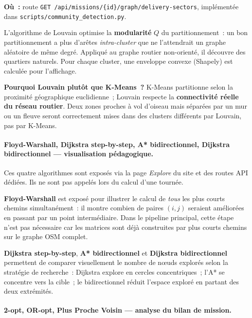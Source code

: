 \documentclass[a4paper, 12pt, twoside]{article}
\begin{document}
\textbf{O\`{u}~:} route \texttt{GET /api/missions/\{id\}/graph/delivery-sectors},
impl\'{e}ment\'{e}e dans \texttt{scripts/community\_detection.py}.

L'algorithme de Louvain optimise la \textbf{modularit\'{e}} $Q$ du partitionnement~:
un bon partitionnement a plus d'ar\^{e}tes \textit{intra-cluster} que ne l'attendrait
un graphe al\'{e}atoire de m\^{e}me degr\'{e}. Appliqu\'{e} au graphe routier non-orient\'{e},
il d\'{e}couvre des quartiers naturels. Pour chaque cluster, une enveloppe convexe
(Shapely) est calcul\'{e}e pour l'affichage.

\textbf{Pourquoi Louvain plut\^{o}t que K-Means~?}
K-Means partitionne selon la proximit\'{e} g\'{e}ographique euclidienne~; Louvain respecte
la \textbf{connectivit\'{e} r\'{e}elle du r\'{e}seau routier}. Deux zones proches \`{a} vol
d'oiseau mais s\'{e}par\'{e}es par un mur ou un fleuve seront correctement mises dans des
clusters diff\'{e}rents par Louvain, pas par K-Means.

\paragraph{Floyd-Warshall, Dijkstra step-by-step, A* bidirectionnel, Dijkstra bidirectionnel --- visualisation p\'{e}dagogique.}

Ces quatre algorithmes sont expos\'{e}s via la page \textit{Explore} du site et des routes
API d\'{e}di\'{e}es. Ils ne sont pas appel\'{e}s lors du calcul d'une tourn\'{e}e.

\textbf{Floyd-Warshall} est expos\'{e} pour illustrer le calcul de \emph{tous} les plus
courts chemins simultan\'{e}ment~: il montre combien de paires $(i,j)$ seraient am\'{e}lior\'{e}es
en passant par un point interm\'{e}diaire. Dans le pipeline principal, cette \'{e}tape n'est pas
n\'{e}cessaire car les matrices sont d\'{e}j\`{a} construites par plus courts chemins sur le
graphe OSM complet.

\textbf{Dijkstra step-by-step}, \textbf{A* bidirectionnel} et \textbf{Dijkstra bidirectionnel}
permettent de comparer visuellement le nombre de n\oe uds explor\'{e}s selon la strat\'{e}gie
de recherche~: Dijkstra explore en cercles concentriques~; l'A* se concentre vers la cible~;
le bidirectionnel r\'{e}duit l'espace explor\'{e} en partant des deux extr\'{e}mit\'{e}s.

\paragraph{2-opt, OR-opt, Plus Proche Voisin --- analyse du bilan de mission.}
\end{document}
